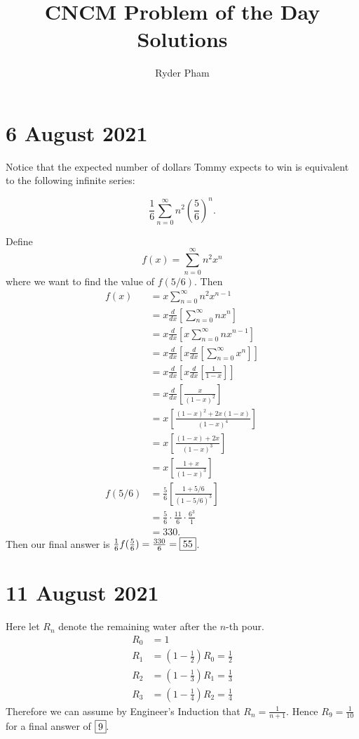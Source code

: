 \documentclass[letterpaper,oneside]{scrartcl}
\begin{document}
\title{CNCM Problem of the Day Solutions}
\author{Ryder Pham}
\maketitle
\newpage
\section*{6 August 2021}

Notice that the expected number of dollars Tommy expects to win is equivalent to the following infinite series:

$$\frac16 \sum_{n=0}^\infty n^2\left(\frac56\right)^n.$$

Define
$$f(x) = \sum_{n=0}^\infty n^2x^n$$
where we want to find the value of $f(5/6)$.
Then
\begin{align*}
    f(x)   & = x\sum_{n=0}^\infty n^2x^{n-1}                                             \\
           & = x\frac{d}{dx}\left[\sum_{n=0}^\infty nx^n\right]                          \\
           & = x\frac{d}{dx}\left[x\sum_{n=0}^\infty nx^{n-1}\right]                     \\
           & = x\frac{d}{dx}\left[x\frac{d}{dx}\left[\sum_{n=0}^\infty x^n\right]\right] \\
           & = x\frac{d}{dx}\left[x\frac{d}{dx}\left[\frac{1}{1-x}\right]\right]         \\
           & = x\frac{d}{dx}\left[\frac{x}{(1-x)^2}\right]                               \\
           & = x\left[\frac{(1-x)^2+2x(1-x)}{(1-x)^4}\right]                             \\
           & = x\left[\frac{(1-x)+2x}{(1-x)^3}\right]                                    \\
           & = x\left[\frac{1+x}{(1-x)^3}\right]                                         \\
    f(5/6) & = \frac56 \left[\frac{1+5/6}{(1-5/6)^3}\right]                              \\
           & = \frac56 \cdot \frac{11}{6} \cdot \frac{6^3}{1}                            \\
           & = 330.
\end{align*}
Then our final answer is $\frac16 f(\frac56) = \frac{330}{6}= \fbox{55}$.

\section*{11 August 2021}
Here let $R_n$ denote the remaining water after the $n$-th pour.
\begin{align*}
    R_0 & = 1                                           \\
    R_1 & = \left(1-\frac{1}{2}\right)R_0 = \frac{1}{2} \\
    R_2 & = \left(1-\frac{1}{3}\right)R_1 = \frac{1}{3} \\
    R_3 & = \left(1-\frac{1}{4}\right)R_2 = \frac{1}{4}
\end{align*}
Therefore we can assume by Engineer's Induction that $R_n = \frac{1}{n+1}.$ Hence $R_9 = \frac{1}{10}$ for a final answer of $\fbox{9}.$
\end{document}
